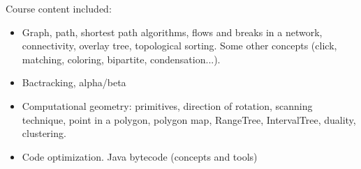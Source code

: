 Course content included:
\begin{itemize}
    \item Graph, path, shortest path algorithms, flows and breaks in a network, connectivity, overlay tree, topological sorting. Some other concepts (click, matching, coloring, bipartite, condensation...).
    \item Bactracking, alpha/beta
    \item Computational geometry: primitives, direction of rotation, scanning technique, point in a polygon, polygon map, RangeTree, IntervalTree, duality, clustering.
    \item Code optimization. Java bytecode (concepts and tools)
\end{itemize}